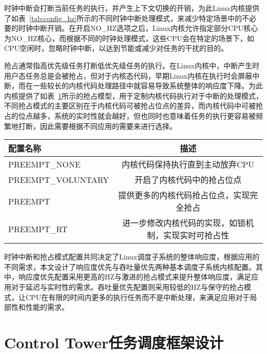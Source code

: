 时钟中断会打断当前任务的执行，并产生上下文切换的开销，为此Linux内核提供了如表~\ref{tab:config_hz}所示的不同时钟中断处理模式，来减少特定场景中的不必要的时钟中断开销。在开启NO\_HZ选项之后，Linux内核允许指定部分CPU核心为NO\_HZ核心，而根据不同的时钟处理模式，这些CPU会在特定的场景下，如CPU空闲时，忽略时钟中断，以达到节能或减少对任务的干扰的目的。

抢占通常指高优先级任务打断低优先级任务的执行。在Linux内核中，中断产生时用户态任务总是会被抢占，但对于内核态代码，早期Linux内核在执行时会屏蔽中断，而在一些较长的内核代码处理路径中就容易导致系统整体的响应度下降。为此内核提供了如表~\ref{tab:config_preempt}所示的抢占模型，用于定制内核代码执行对于中断的处理模式，不同抢占模式的主要区别在于内核代码可被抢占位点的差异，而内核代码中可被抢占的位点越多，系统的实时性就会越好，但也同时也意味着任务的执行更容易被频繁地打断，因此需要根据不同应用的需要来进行选择。

\begin{table}
    \label{tab:config_preempt}
    \footnotesize%
    \setlength{\tabcolsep}{4pt}%
    \renewcommand{\arraystretch}{1.25}%
    \centering
    \begin{tabular}{lc}
        \hline
        配置名称 & 描述 \\
        \hline
        PREEMPT\_NONE  & 内核代码保持执行直到主动放弃CPU  \\
        PREEMPT\_VOLUNTARY  & 开启了内核代码中的抢占位点 \\
        PREEMPT  & 提供更多的内核代码抢占位点，实现完全抢占 \\
        PREEMPT\_RT & 进一步修改内核代码的实现，如锁机制，实现实时可抢占性 \\
        \hline
    \end{tabular}
\end{table}

时钟中断和抢占模式配置共同决定了Linux调度子系统的整体响应度，根据应用的不同需求，本文设计了响应度优先与吞吐量优先两种基本调度子系统内核配置。其中，响应度优先配置采用更高的HZ与激进的抢占模式来提升整体响应度，满足应用对于延迟与实时性的需求。吞吐量优先配置则采用较低的HZ与保守的抢占模式，让CPU在有限的时间内更多的执行任务而不是中断处理，来满足应用对于局部性和性能的需求。

\section{Control Tower任务调度框架设计}


